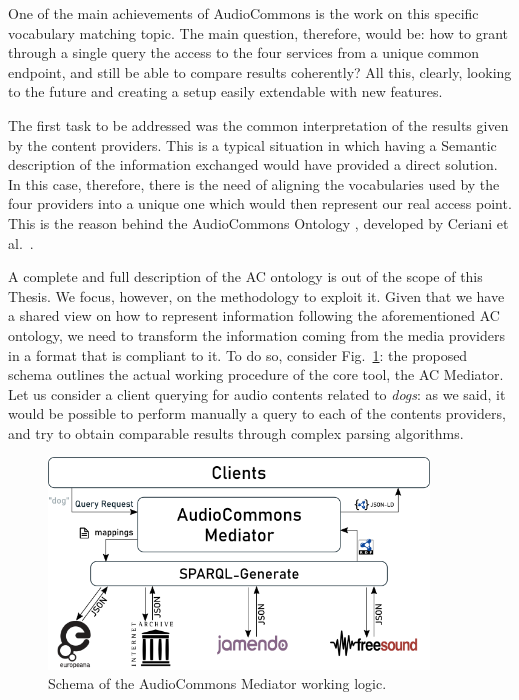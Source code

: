 One of the main achievements of AudioCommons is the work on this specific vocabulary matching topic. The main question, therefore, would be: how to grant through a single query the access to the four services from a unique common endpoint, and still be able to compare results coherently? All this, clearly, looking to the future and creating a setup easily extendable with new features.

The first task to be addressed was the common interpretation of the results given by the content providers. This is a typical situation in which having a Semantic description of the information exchanged would have provided a direct solution. In this case, therefore, there is the need of aligning the vocabularies used by the four providers into a unique one which would then represent our real access point. This is the reason behind the AudioCommons Ontology , developed by Ceriani et al.~\cite{ceriani2018audio}. 

A complete and full description of the AC ontology is out of the scope of this Thesis. We focus, however, on the methodology to exploit it. Given that we have a shared view on how to represent information following the aforementioned AC ontology, we need to transform the information coming from the media providers in a format that is compliant to it. To do so, consider Fig.~\ref{fig:ac_schema}: the proposed schema outlines the actual working procedure of the core tool, the AC Mediator. Let us consider a client querying for audio contents related to \textit{dogs}: as we said, it would be possible to perform manually a query to each of the contents providers, and try to obtain comparable results through complex parsing algorithms. 
\begin{figure}
\centering
\includegraphics[width=0.9\textwidth]{audiocommons_schema.png}
\caption{Schema of the AudioCommons Mediator working logic.}
\label{fig:ac_schema}
\end{figure}

